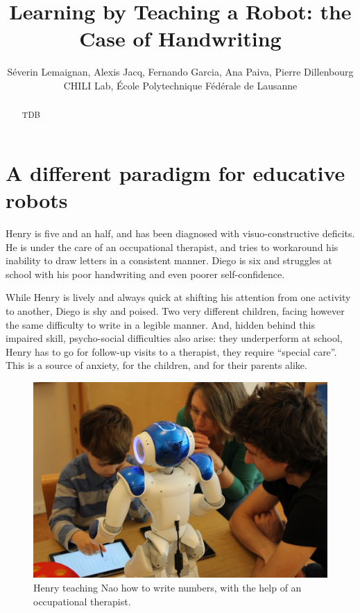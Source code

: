 \documentclass{article}
\title{Learning by Teaching a Robot: the Case of Handwriting}
\author{S\'everin Lemaignan, Alexis Jacq, Fernando Garcia, Ana Paiva, Pierre
Dillenbourg \\ CHILI Lab, \'Ecole Polytechnique F\'ed\'erale de Lausanne}
\begin{document}
\maketitle

\begin{abstract}
    TDB
\end{abstract}


\section{A different paradigm for educative robots}

Henry is five and an half, and has been diagnosed with visuo-constructive
deficits. He is under the care of an occupational therapist, and tries to
workaround his inability to draw letters in a consistent manner. Diego is six
and struggles at school with his poor handwriting and even poorer
self-confidence.

While Henry is lively and always quick at shifting his attention from one
activity to another, Diego is shy and poised. Two very different children,
facing however the same difficulty to write in a legible manner. And, hidden
behind this impaired skill, psycho-social difficulties also arise: they
underperform at school, Henry has to go for follow-up visits to a therapist,
they require ``special care''. This is a source of anxiety, for the children,
and for their parents alike.

\begin{figure}
    \centering
    \includegraphics[width=0.9\linewidth]{henry}
    \caption{\small Henry teaching Nao how to write numbers, with the help of an
    occupational therapist.}
    \label{fig:henry}
\end{figure}
\end{document}
